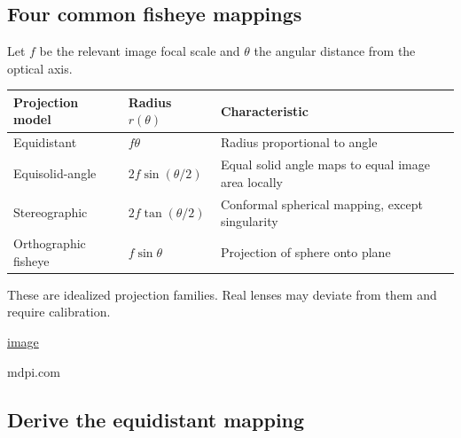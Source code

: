 \subsection{Four common fisheye mappings}\label{02-foundations-ii-ch035-four-common-fisheye-mappings}

\hypertarget{02-foundations-ii-ch035-four-common-fisheye-mappings}{}

Let \(f\) be the relevant image focal scale and \(\theta\) the angular distance from the optical axis.

{\def\LTcaptype{none} %
\begin{longtable}[]{@{}
  >{\raggedright\arraybackslash}p{}
  >{\raggedright\arraybackslash}p{}
  >{\raggedright\arraybackslash}p{}@{}}
\toprule\noalign{}
\begin{minipage}[b]{\linewidth}\raggedright
Projection model
\end{minipage} & \begin{minipage}[b]{\linewidth}\raggedright
Radius \(r(\theta)\)
\end{minipage} & \begin{minipage}[b]{\linewidth}\raggedright
Characteristic
\end{minipage} \\
\midrule\noalign{}
\endhead
\bottomrule\noalign{}
\endlastfoot
Equidistant & \(f\theta\) & Radius proportional to angle \\
Equisolid-angle & \(2f\sin(\theta/2)\) & Equal solid angle maps to equal image area locally \\
Stereographic & \(2f\tan(\theta/2)\) & Conformal spherical mapping, except singularity \\
Orthographic fisheye & \(f\sin\theta\) & Projection of sphere onto plane \\
\end{longtable}
}

These are idealized projection families. Real lenses may deviate from them and require calibration. 

\href{https://www.google.com/s2/favicons?domain=https://www.mdpi.com&sz=32}{image}

mdpi.com

\subsection{Derive the equidistant mapping}\label{02-foundations-ii-ch035-derive-the-equidistant-mapping}


